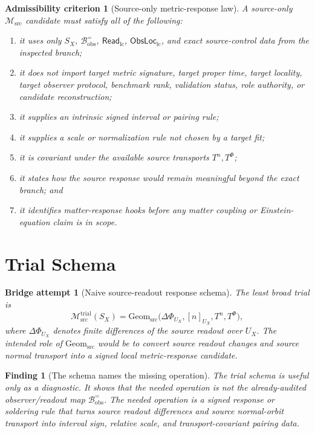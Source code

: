 \documentclass[11pt]{article}
\newcommand{\ReadLC}{\mathsf{Read}_{\mathrm{lc}}}
\newcommand{\ObsLocLC}{\mathsf{ObsLoc}_{\mathrm{lc}}}
\newcommand{\Bobs}{\mathcal{B}^{=}_{\mathrm{obs}}}
\newcommand{\Msrc}{\mathcal{M}_{\mathrm{src}}}
\newcommand{\Mtrial}{\mathcal{M}^{\mathrm{trial}}_{\mathrm{src}}}
\newtheorem{criterion}{Admissibility criterion}
\newtheorem{attempt}{Bridge attempt}
\newtheorem{finding}{Finding}
\begin{document}
\begin{criterion}[Source-only metric-response law]
A source-only \(\Msrc\) candidate must satisfy all of the following:
\begin{enumerate}
    \item it uses only \(S_X\), \(\Bobs\), \(\ReadLC\), \(\ObsLocLC\),
    and exact source-control data from the inspected branch;
    \item it does not import target metric signature, target proper
    time, target locality, target observer protocol, benchmark rank,
    validation status, role authority, or candidate reconstruction;
    \item it supplies an intrinsic signed interval or pairing rule;
    \item it supplies a scale or normalization rule not chosen by a
    target fit;
    \item it is covariant under the available source transports
    \(T^n,T^\Phi\);
    \item it states how the source response would remain meaningful
    beyond the exact branch; and
    \item it identifies matter-response hooks before any matter
    coupling or Einstein-equation claim is in scope.
\end{enumerate}
\end{criterion}

\section{Trial Schema}

\begin{attempt}[Naive source-readout response schema]
The least broad trial is
\[
    \Mtrial(S_X)
    =
    \mathrm{Geom}_{\mathrm{src}}
    \bigl(\Delta\Phi_{U_X},[n]_{U_X},T^n,T^\Phi\bigr),
\]
where \(\Delta\Phi_{U_X}\) denotes finite differences of the source
readout over \(U_X\). The intended role of
\(\mathrm{Geom}_{\mathrm{src}}\) would be to convert source readout
changes and source normal transport into a signed local
metric-response candidate.
\end{attempt}

\begin{finding}[The schema names the missing operation]
The trial schema is useful only as a diagnostic. It shows that the
needed operation is not the already-audited observer/readout map
\(\Bobs\). The needed operation is a signed response or soldering rule
that turns source readout differences and source normal-orbit
transport into interval sign, relative scale, and
transport-covariant pairing data.
\end{finding}
\end{document}
